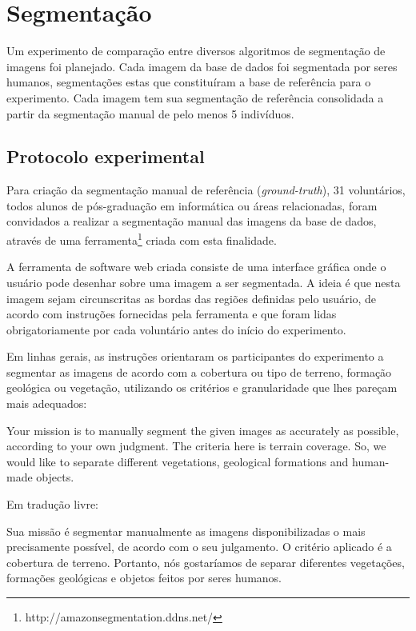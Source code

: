 \section{Segmentação}\label{sec:expSegmentacao}

Um experimento de comparação entre diversos algoritmos de segmentação de imagens foi planejado. Cada imagem da base de dados foi segmentada por seres humanos, segmentações estas que constituíram a base de referência para o experimento. Cada imagem tem sua segmentação de referência consolidada a partir da segmentação manual de pelo menos 5 indivíduos.

\subsection{Protocolo experimental}

Para criação da segmentação manual de referência (\textit{ground-truth}), 31 voluntários, todos alunos de pós-graduação em informática ou áreas relacionadas, foram convidados a realizar a segmentação manual das imagens da base de dados, através de uma ferramenta\footnote{http://amazonsegmentation.ddns.net/} criada com esta finalidade.

A ferramenta de software web criada consiste de uma interface gráfica onde o usuário pode desenhar sobre uma imagem a ser segmentada. A ideia é que nesta imagem sejam circunscritas as bordas das regiões definidas pelo usuário, de acordo com instruções fornecidas pela ferramenta e que foram lidas obrigatoriamente por cada voluntário antes do início do experimento.

Em linhas gerais, as instruções orientaram os participantes do experimento a segmentar as imagens de acordo com a cobertura ou tipo de terreno, formação geológica ou vegetação, utilizando os critérios e granularidade que lhes pareçam mais adequados:

\begin{citacao}[english]
Your mission is to manually segment the given images as accurately as possible, according to your own judgment. The criteria here is terrain coverage. So, we would like to separate different vegetations, geological formations and human-made objects. \cite{amazonsegmentation}
\end{citacao}

Em tradução livre:

\begin{citacao}
Sua missão é segmentar manualmente as imagens disponibilizadas o mais precisamente possível, de acordo com o seu julgamento. O critério aplicado é a cobertura de terreno. Portanto, nós gostaríamos de separar diferentes vegetações, formações geológicas e objetos feitos por seres humanos. \cite{amazonsegmentation}
\end{citacao}


